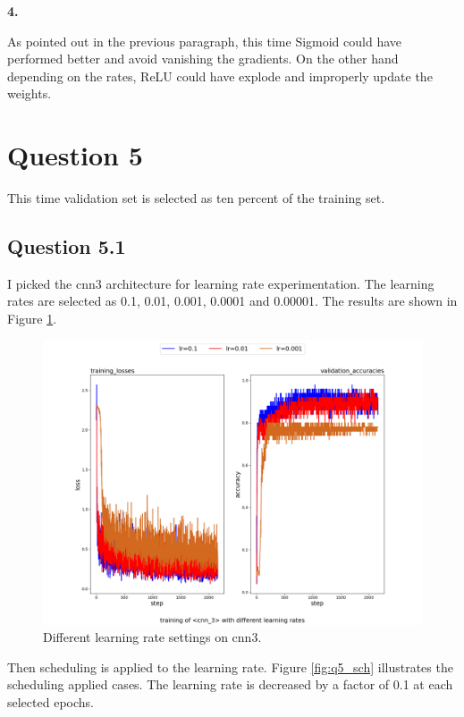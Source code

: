 \documentclass{assignment}
\begin{document}
\textbf{4.}

As pointed out in the previous paragraph, this time Sigmoid could have performed better and avoid vanishing the gradients. On the other hand depending on the rates, ReLU could have explode and improperly update the weights.
\section{Question 5}
This time validation set is selected as ten percent of the training set.
\subsection{Question 5.1}
I picked the cnn3 architecture for learning rate experimentation. The learning rates are selected as 0.1, 0.01, 0.001, 0.0001 and 0.00001. The results are shown in Figure \ref{fig:q5}.


\begin{figure}[htbp!]
    \centering
    \includegraphics[width=1\textwidth]{figures/q5_1.png}
    \caption{Different learning rate settings on cnn3.}
    \label{fig:q5}
\end{figure}

Then scheduling is applied to the learning rate. Figure \ref{fig:q5_sch} illustrates the scheduling applied cases. The learning rate is decreased by a factor of 0.1 at each selected epochs.
\end{document}

